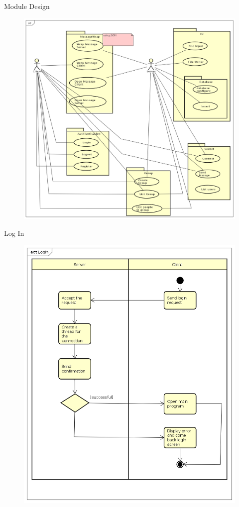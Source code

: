 \documentclass{beamer}
\begin{document}
\begin{frame}{Module Design}
\begin{figure}
\includegraphics[scale=0.2]{usecase.png}
\end{figure}
\end{frame}

\begin{frame}{Log In}
\begin{figure}
\includegraphics[scale=0.2]{Login.png}
\end{figure}
\end{frame}
\end{document}
